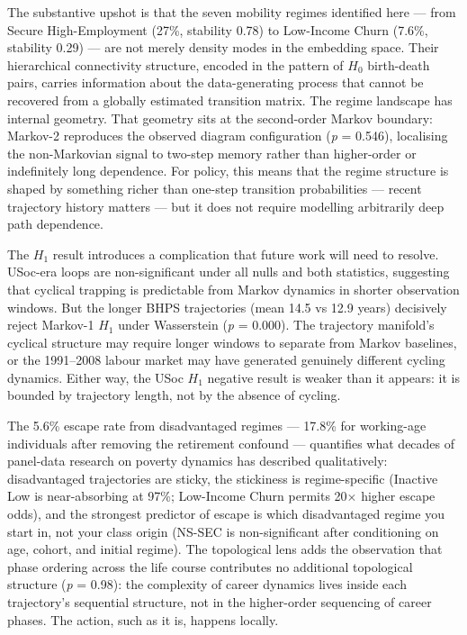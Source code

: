 The substantive upshot is that the seven mobility regimes identified here --- from Secure High-Employment (27\%, stability 0.78) to Low-Income Churn (7.6\%, stability 0.29) --- are not merely density modes in the embedding space. Their hierarchical connectivity structure, encoded in the pattern of $H_0$ birth-death pairs, carries information about the data-generating process that cannot be recovered from a globally estimated transition matrix. The regime landscape has internal geometry. That geometry sits at the second-order Markov boundary: Markov-2 reproduces the observed diagram configuration (\textit{p} = 0.546), localising the non-Markovian signal to two-step memory rather than higher-order or indefinitely long dependence. For policy, this means that the regime structure is shaped by something richer than one-step transition probabilities --- recent trajectory history matters --- but it does not require modelling arbitrarily deep path dependence.

The $H_1$ result introduces a complication that future work will need to resolve. USoc-era loops are non-significant under all nulls and both statistics, suggesting that cyclical trapping is predictable from Markov dynamics in shorter observation windows. But the longer BHPS trajectories (mean 14.5 vs 12.9 years) decisively reject Markov-1 $H_1$ under Wasserstein (\textit{p} = 0.000). The trajectory manifold's cyclical structure may require longer windows to separate from Markov baselines, or the 1991--2008 labour market may have generated genuinely different cycling dynamics. Either way, the USoc $H_1$ negative result is weaker than it appears: it is bounded by trajectory length, not by the absence of cycling.

The 5.6\% escape rate from disadvantaged regimes --- 17.8\% for working-age individuals after removing the retirement confound --- quantifies what decades of panel-data research on poverty dynamics has described qualitatively: disadvantaged trajectories are sticky, the stickiness is regime-specific (Inactive Low is near-absorbing at 97\%; Low-Income Churn permits 20$\times$ higher escape odds), and the strongest predictor of escape is which disadvantaged regime you start in, not your class origin (NS-SEC is non-significant after conditioning on age, cohort, and initial regime). The topological lens adds the observation that phase ordering across the life course contributes no additional topological structure (\textit{p} = 0.98): the complexity of career dynamics lives inside each trajectory's sequential structure, not in the higher-order sequencing of career phases. The action, such as it is, happens locally.

